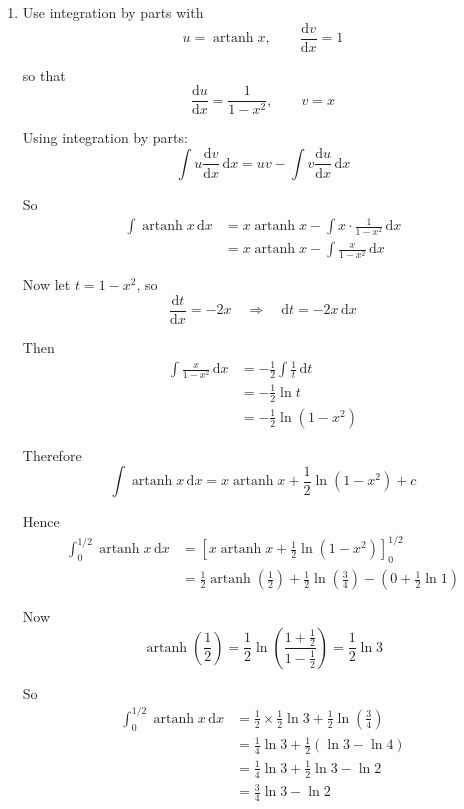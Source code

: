\documentclass[leqno]{article}
\begin{document}
\begin{enumerate}[
  label=\textbf{\arabic*.},
  leftmargin=*,
  topsep=0pt,
  partopsep=0pt,
  parsep=0pt
]
\begin{djsSolution}
\begin{enumerate}[label=\textbf{(\alph*)}]
Hence
\[
\frac{\mathrm{d}}{\mathrm{d}x}\bigl(\operatorname{artanh} x\bigr)=\frac{1}{1-x^2}\qquad (|x|<1)
\]

  \item Use integration by parts with
\[
u=\operatorname{artanh} x,\qquad \frac{\mathrm{d}v}{\mathrm{d}x}=1
\]

so that
\[
\frac{\mathrm{d}u}{\mathrm{d}x}=\frac{1}{1-x^2},\qquad v=x
\]

Using integration by parts:
\[
\int u\frac{\mathrm{d}v}{\mathrm{d}x}\,\mathrm{d}x = uv - \int v\frac{\mathrm{d}u}{\mathrm{d}x}\,\mathrm{d}x
\]

So
\begin{align*}
\int \operatorname{artanh} x\,\mathrm{d}x
&=x\operatorname{artanh} x-\int x\cdot \frac{1}{1-x^2}\,\mathrm{d}x \\
&=x\operatorname{artanh} x-\int \frac{x}{1-x^2}\,\mathrm{d}x
\end{align*}

Now let \(t=1-x^2\), so
\[
\frac{\mathrm{d}t}{\mathrm{d}x}=-2x \quad\Longrightarrow\quad \mathrm{d}t=-2x\,\mathrm{d}x
\]

Then
\begin{align*}
\int \frac{x}{1-x^2}\,\mathrm{d}x
&=-\frac12\int \frac{1}{t}\,\mathrm{d}t \\
&=-\frac12\ln t \\
&=-\frac12\ln(1-x^2)
\end{align*}

Therefore
\[
\int \operatorname{artanh} x\,\mathrm{d}x
=x\operatorname{artanh} x+\frac12\ln(1-x^2)+c
\]

Hence
\begin{align*}
\int_0^{1/2}\operatorname{artanh} x\,\mathrm{d}x
&=\left[x\operatorname{artanh} x+\frac12\ln(1-x^2)\right]_0^{1/2} \\
&=\frac12\operatorname{artanh}\left(\frac12\right)+\frac12\ln\left(\frac34\right)-\left(0+\frac12\ln 1\right)
\end{align*}

Now
\[
\operatorname{artanh}\left(\frac12\right)=\frac12\ln\left(\frac{1+\frac12}{1-\frac12}\right)=\frac12\ln 3
\]

So
\begin{align*}
\int_0^{1/2}\operatorname{artanh} x\,\mathrm{d}x
&=\frac12\times \frac12\ln 3+\frac12\ln\left(\frac34\right) \\
&=\frac14\ln 3+\frac12(\ln 3-\ln 4) \\
&=\frac14\ln 3+\frac12\ln 3-\ln 2 \\
&=\frac34\ln 3-\ln 2
\end{align*}


\end{enumerate}
\end{djsSolution}
\end{enumerate}
\end{document}
